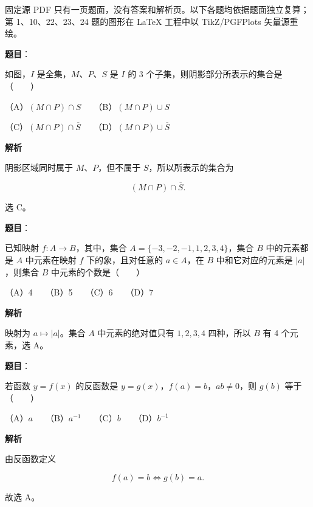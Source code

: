 

\begin{gktip}
固定源 PDF 只有一页题面，没有答案和解析页。以下各题均依据题面独立复算；第 1、10、22、23、24 题的图形在 LaTeX 工程中以 TikZ/PGFPlots 矢量源重绘。
\end{gktip}

\begin{answer}

\textbf{题目}：

如图，$I$ 是全集，$M$、$P$、$S$ 是 $I$ 的 3 个子集，则阴影部分所表示的集合是\mbox{（　　）}
\nopagebreak[4]
\begin{center}\end{center}
\nopagebreak[4]
（A）$(M\cap P)\cap S$　　（B）$(M\cap P)\cup S$

（C）$(M\cap P)\cap\overline S$　　（D）$(M\cap P)\cup\overline S$

\textbf{解析}

阴影区域同时属于 $M$、$P$，但不属于 $S$，所以所表示的集合为

\nopagebreak[4]
\[
(M\cap P)\cap\overline S.
\]

选 C。


\end{answer}
\begin{answer}

\textbf{题目}：

已知映射 $f:A\to B$，其中，集合 $A=\{-3,-2,-1,1,2,3,4\}$，集合 $B$ 中的元素都是 $A$ 中元素在映射 $f$ 下的象，且对任意的 $a\in A$，在 $B$ 中和它对应的元素是 $|a|$，则集合 $B$ 中元素的个数是\mbox{（　　）}

（A）4　　（B）5　　（C）6　　（D）7

\textbf{解析}

映射为 $a\mapsto|a|$。集合 $A$ 中元素的绝对值只有 $1,2,3,4$ 四种，所以 $B$ 有 4 个元素，选 A。


\end{answer}
\begin{answer}

\textbf{题目}：

若函数 $y=f(x)$ 的反函数是 $y=g(x)$，$f(a)=b$，$ab\ne0$，则 $g(b)$ 等于\mbox{（　　）}

（A）$a$　　（B）$a^{-1}$　　（C）$b$　　（D）$b^{-1}$

\textbf{解析}

由反函数定义

\nopagebreak[4]
\[
f(a)=b\Longleftrightarrow g(b)=a.
\]

故选 A。


\end{answer}
